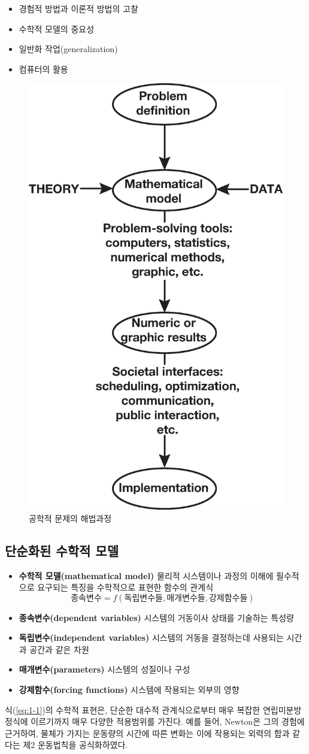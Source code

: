 \begin{itemize}
\item 경험적 방법과 이론적 방법의 고찰
\item 수학적 모델의 중요성
\item 일반화 작업(generalization)
\item 컴퓨터의 활용
\end{itemize}
\begin{figure}[!hbpt]
\centering
\includegraphics[keepaspectratio=true,width=0.4\linewidth]{figs/1-1.eps}
\caption{공학적 문제의 해법과정}
\label{fig:1-1}
\end{figure}

\clearpage
\subsection{단순화된 수학적 모델}

\begin{itemize}
\item \textbf{수학적 모델(mathematical model)} 물리적 시스템이나 과정의 이해에 필수적으로 요구되는 특징을 수학적으로 표현한 함수의 관계식
\begin{equation}
종속변수=f\left(독립변수들, 매개변수들, 강제함수들\right)
\label{eq:1-1}
\end{equation}
\item \textbf{종속변수(dependent variables)} 시스템의 거동이사 상태를 기술하는 특성량
\item \textbf{독립변수(independent variables)} 시스템의 거동을 결정하는데 사용되는 시간과 공간과 같은 차원
\item \textbf{매개변수(parameters)} 시스템의 성질이나 구성
\item \textbf{강제함수(forcing functions)} 시스템에 작용되는 외부의 영향
\end{itemize}
식(\ref{eq:1-1})의 수학적 표현은, 단순한 대수적 관계식으로부터 매우 복잡한 연립미분방정식에 이르기까지 매우 다양한 적용범위를 가진다. 예를 들어, Newton은 그의 경험에 근거하여, 물체가 가지는 운동량의 시간에 따른 변화는 이에 작용되는 외력의 합과 같다는 제2 운동법칙을 공식화하였다.

